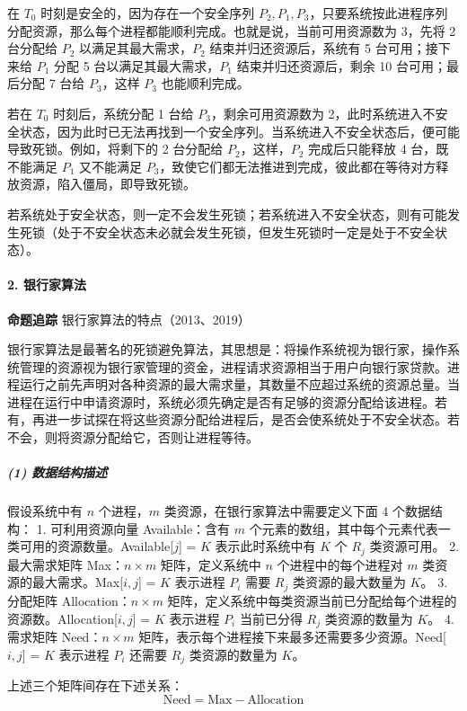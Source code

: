 \documentclass{ctexbook}
\begin{document}
	在 $T_0$ 时刻是安全的，因为存在一个安全序列 $P_2, P_1, P_3$，只要系统按此进程序列分配资源，那么每个进程都能顺利完成。也就是说，当前可用资源数为 3，先将 2 台分配给 $P_2$ 以满足其最大需求，$P_2$ 结束并归还资源后，系统有 5 台可用；接下来给 $P_1$ 分配 5 台以满足其最大需求，$P_1$ 结束并归还资源后，剩余 10 台可用；最后分配 7 台给 $P_3$，这样 $P_3$ 也能顺利完成。
	
	若在 $T_0$ 时刻后，系统分配 1 台给 $P_3$，剩余可用资源数为 2，此时系统进入不安全状态，因为此时已无法再找到一个安全序列。当系统进入不安全状态后，便可能导致死锁。例如，将剩下的 2 台分配给 $P_2$，这样，$P_2$ 完成后只能释放 4 台，既不能满足 $P_1$ 又不能满足 $P_3$，致使它们都无法推进到完成，彼此都在等待对方释放资源，陷入僵局，即导致死锁。
	
	若系统处于安全状态，则一定不会发生死锁；若系统进入不安全状态，则有可能发生死锁（处于不安全状态未必就会发生死锁，但发生死锁时一定是处于不安全状态）。
	
	\paragraph{2. 银行家算法}
	
	\textbf{命题追踪} 银行家算法的特点（2013、2019）
	
	银行家算法是最著名的死锁避免算法，其思想是：将操作系统视为银行家，操作系统管理的资源视为银行家管理的资金，进程请求资源相当于用户向银行家贷款。进程运行之前先声明对各种资源的最大需求量，其数量不应超过系统的资源总量。当进程在运行中申请资源时，系统必须先确定是否有足够的资源分配给该进程。若有，再进一步试探在将这些资源分配给进程后，是否会使系统处于不安全状态。若不会，则将资源分配给它，否则让进程等待。
	
	\subparagraph{(1) 数据结构描述}
	
	假设系统中有 $n$ 个进程，$m$ 类资源，在银行家算法中需要定义下面 4 个数据结构：
	1. 可利用资源向量 Available：含有 $m$ 个元素的数组，其中每个元素代表一类可用的资源数量。Available[$j$] = $K$ 表示此时系统中有 $K$ 个 $R_j$ 类资源可用。
	2. 最大需求矩阵 Max：$n \times m$ 矩阵，定义系统中 $n$ 个进程中的每个进程对 $m$ 类资源的最大需求。Max[$i, j$] = $K$ 表示进程 $P_i$ 需要 $R_j$ 类资源的最大数量为 $K$。
	3. 分配矩阵 Allocation：$n \times m$ 矩阵，定义系统中每类资源当前已分配给每个进程的资源数。Allocation[$i, j$] = $K$ 表示进程 $P_i$ 当前已分得 $R_j$ 类资源的数量为 $K$。
	4. 需求矩阵 Need：$n \times m$ 矩阵，表示每个进程接下来最多还需要多少资源。Need[$i, j$] = $K$ 表示进程 $P_i$ 还需要 $R_j$ 类资源的数量为 $K$。
	
	上述三个矩阵间存在下述关系：
	\[
	\text{Need} = \text{Max} - \text{Allocation}
	\]
	
\end{document}
